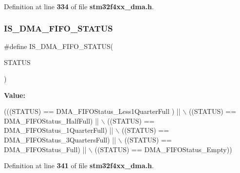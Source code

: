 Definition at line \textbf{ 334} of file \textbf{ stm32f4xx\+\_\+dma.\+h}.

\mbox{\label{group__DMA__fifo__status__level_ga6980114eab3b3eea701f3802dd97dc12}} 
\subsubsection{I\+S\+\_\+\+D\+M\+A\+\_\+\+F\+I\+F\+O\+\_\+\+S\+T\+A\+T\+US}
{\footnotesize\ttfamily \#define I\+S\+\_\+\+D\+M\+A\+\_\+\+F\+I\+F\+O\+\_\+\+S\+T\+A\+T\+US(\begin{DoxyParamCaption}\item[{}]{S\+T\+A\+T\+US }\end{DoxyParamCaption})}

{\bfseries Value\+:}
\begin{DoxyCode}
(((STATUS) == DMA_FIFOStatus_Less1QuarterFull ) || \(\backslash\)
                                    ((STATUS) == DMA_FIFOStatus_HalfFull)          || \(\backslash\)
                                    ((STATUS) == DMA_FIFOStatus_1QuarterFull)      || \(\backslash\)
                                    ((STATUS) == DMA_FIFOStatus_3QuartersFull)     || \(\backslash\)
                                    ((STATUS) == DMA_FIFOStatus_Full)              || \(\backslash\)
                                    ((STATUS) == DMA_FIFOStatus_Empty))
\end{DoxyCode}


Definition at line \textbf{ 341} of file \textbf{ stm32f4xx\+\_\+dma.\+h}.


